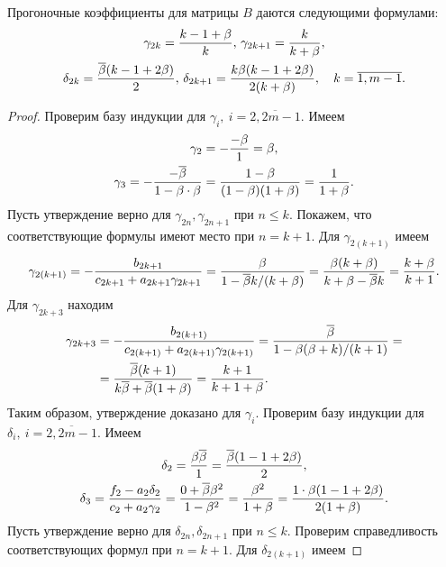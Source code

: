 {\begin{proposition}
  \label{ch1:prop:tridiagonal:coefficients}
  Прогоночные коэффициенты для матрицы $B$ даются следующими формулами\textup{:}
  \begin{multline*}
    \gamma_{2k} = \frac{k-1+\beta}{k}, \,
    \gamma_{2k+1} = \frac{k}{k+\beta}, \\
    \delta_{2k} = \frac{{{\overline{\beta}}}(k-1+2\beta)}{2}, \, \delta_{2k+1} =
    \frac{k\beta(k-1+2\beta)}{2(k+\beta)}, \quad k = \overline{1,m-1}.
  \end{multline*}
\end{proposition}
\begin{proof}
  Проверим базу индукции для $\gamma_i,\ i = \overline{2, 2m-1}$.
  Имеем
  \begin{gather*}
    \gamma_2 = - \frac{-\beta}{1} = \beta,\\
    \gamma_3 = - \frac{-{{\overline{\beta}}}}{1 - \beta \cdot \beta} = \frac{1 - \beta}{(1 - \beta)(1 + \beta)} = \frac{1}{1 + \beta}.
  \end{gather*}
  Пусть утверждение верно для $\gamma_{2n}, \gamma_{2n+1}$ при $n \leq k$.
  Покажем, что соответствующие формулы имеют место при $n = k + 1$.
  Для $\gamma_{2(k+1)}$ имеем
  \begin{gather*}
    \gamma_{2(k+1)} =
    -\frac{b_{2k+1}}{c_{2k+1} + a_{2k+1} \gamma_{2k+1}} =
    \frac{\beta}{1 - {{\overline{\beta}}} k / (k+\beta)} = \frac{\beta (k + \beta)}{k + \beta - {{\overline{\beta}}} k} = \frac{k+\beta}{k + 1}.
  \end{gather*}
  Для $\gamma_{2k + 3}$ находим
  \begin{align*}
    \gamma_{2k+3} 
    &=
    - \frac{b_{2(k+1)}}{c_{2(k+1)} + a_{2(k+1)}\gamma_{2(k+1)}} = 
    \frac{{{\overline{\beta}}}}{1 - \beta (\beta + k)/(k+1)} = \\
    &= \frac{{{\overline{\beta}}} (k+1)}{k{{\overline{\beta}}} + {{\overline{\beta}}}(1+\beta)} =
    \frac{k + 1}{k + 1 + \beta}.
  \end{align*}
  Таким образом, утверждение доказано для $\gamma_i$.
  Проверим базу индукции для $\delta_i,\ i = \overline{2, 2m-1}$.
  Имеем
  \begin{gather*}
    \delta_2 = \frac{\beta {{\overline{\beta}}}}{1} = \frac{{{\overline{\beta}}} (1 - 1 + 2\beta)}{2},\\
    \delta_3 =
    \frac{f_2 - a_2 \delta_2}{c_2 + a_2 \gamma_2} =
    \frac{0 + {{\overline{\beta}}} \beta^2}{1 - \beta^2} =
    \frac{\beta^2}{1 + \beta} =
    \frac{1 \cdot \beta (1 - 1 + 2\beta)}{2(1+\beta)}.
  \end{gather*}
  Пусть утверждение верно для $\delta_{2n}, \delta_{2n+1}$ при $n \leq k$.
  Проверим справедливость соответствующих формул при $n = k+1$.
  Для $\delta_{2(k+1)}$ имеем

\end{proof}}
